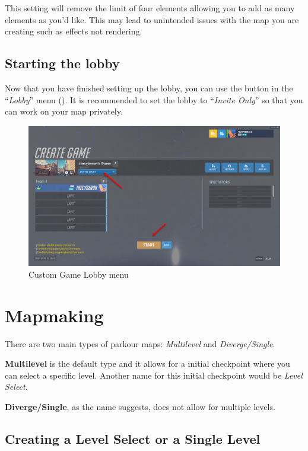 \documentclass[12pt,a4paper]{article}
\begin{document}
        This setting will remove the limit of four elements allowing you to add as many elements as you'd like. This may lead to unintended issues with the map you are creating such as effects not rendering.
    
    \subsection{Starting the lobby}
        Now that you have finished setting up the lobby, you can use the  button in the ``\textit{Lobby}'' menu (). It is recommended to set the lobby to ``\textit{Invite Only}'' so that you can work on your map privately.
        \begin{figure}[ht]
            \centering
            \includegraphics[width=\textwidth,height=\textheight,keepaspectratio]{Picture3.png}
            \caption{Custom Game Lobby menu}
            \label{fig:Picture3}
        \end{figure}
\newpage
\section{Mapmaking}
    There are two main types of parkour maps: \emph{Multilevel} and \emph{Diverge/Single}.
    
    \textbf{Multilevel} is the default type and it allows for a initial checkpoint where you can select a specific level.  Another name for this initial checkpoint would be \emph{Level Select}.
        
    \textbf{Diverge/Single}, as the name suggests, does not allow for multiple levels.
    
    \subsection{Creating a Level Select or a Single Level}
        
\end{document}

